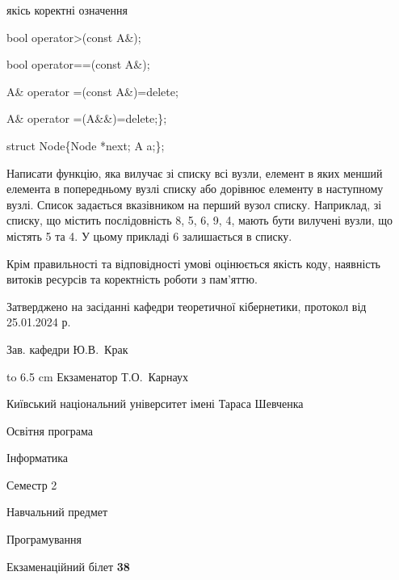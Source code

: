 \documentclass[12pt, ukrainian]{article}
\begin{document}
{\quad  якісь коректні означення 

\quad  bool operator>(const A\&); 

\quad  bool operator==(const A\&); 

\quad A\& operator =(const A\&)=delete; 

\quad  A\& operator =(A\&\&)=delete;\};

struct Node\{Node *next; A a;\};

 Написати функцію, яка вилучає зі списку всі вузли, елемент в яких менший елемента в попередньому вузлі списку або дорівнює елементу в наступному вузлі. Список задається вказівником на перший вузол списку. Наприклад, зі списку, що містить послідовність 8, 5, 6, 9, 4, мають бути вилучені вузли, що містять 5 та 4. У цьому прикладі 6 залишається в списку.

Крім правильності та відповідності умові оцінюється якість коду, наявність витоків ресурсів та коректність роботи з пам'яттю. 

}
{\smallskip\smallskip \begin {scriptsize} Затверджено на засіданні кафедри теоретичної кібернетики, протокол   від   25.01.2024 р.\par\smallskip\smallskip\smallskip\smallskip
{\parbox {6.5 cm} {Зав. кафедри \dotfill Ю.В.~Крак}}\hspace {0.7cm} {\hbox to 6.5 cm { Екзаменатор \dotfill Т.О.~Карнаух}} \end{scriptsize}}
\newpage
{{\begin {scriptsize}\par
{ \center  Київський національний університет імені Тараса Шевченка \par}
{\parbox {5 cm}{Освітня програма \hfill}{\parbox {7 cm}{Інформатика\hfill}}\parbox {6 cm}{\hfill Семестр 2}}\par
{\parbox {5 cm} {Навчальний предмет \hfill}\parbox {7 cm}{Програмування \hfill}\parbox {6cm}{\hfill}\par}\vspace{-15pt} \end{scriptsize}}{\center Екзаменаційний білет \No \textbf { 38 }\par}}
\end{document}

